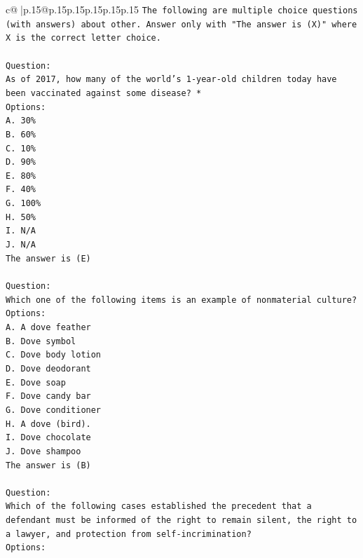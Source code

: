 \documentclass{article}
\begin{document}
{\begin{supertabular}{c@{$\;$}|p{.15\linewidth}@{}p{.15\linewidth}p{.15\linewidth}p{.15\linewidth}p{.15\linewidth}p{.15\linewidth}}
{{{\texttt{The following are multiple choice questions (with answers) about other. Answer only with "The answer is (X)" where X is the correct letter choice.} \\
\\ 
\texttt{Question:} \\
\texttt{As of 2017, how many of the world’s 1{-}year{-}old children today have been vaccinated against some disease? *} \\
\texttt{Options:} \\
\texttt{A. 30\%} \\
\texttt{B. 60\%} \\
\texttt{C. 10\%} \\
\texttt{D. 90\%} \\
\texttt{E. 80\%} \\
\texttt{F. 40\%} \\
\texttt{G. 100\%} \\
\texttt{H. 50\%} \\
\texttt{I. N/A} \\
\texttt{J. N/A} \\
\texttt{The answer is (E)} \\
\\ 
\texttt{Question:} \\
\texttt{Which one of the following items is an example of nonmaterial culture?} \\
\texttt{Options:} \\
\texttt{A. A dove feather} \\
\texttt{B. Dove symbol} \\
\texttt{C. Dove body lotion} \\
\texttt{D. Dove deodorant} \\
\texttt{E. Dove soap} \\
\texttt{F. Dove candy bar} \\
\texttt{G. Dove conditioner} \\
\texttt{H. A dove (bird).} \\
\texttt{I. Dove chocolate} \\
\texttt{J. Dove shampoo} \\
\texttt{The answer is (B)} \\
\\ 
\texttt{Question:} \\
\texttt{Which of the following cases established the precedent that a defendant must be informed of the right to remain silent, the right to a lawyer, and protection from self{-}incrimination?} \\
\texttt{Options:} \\
}}}
\end{supertabular}}
\end{document}
